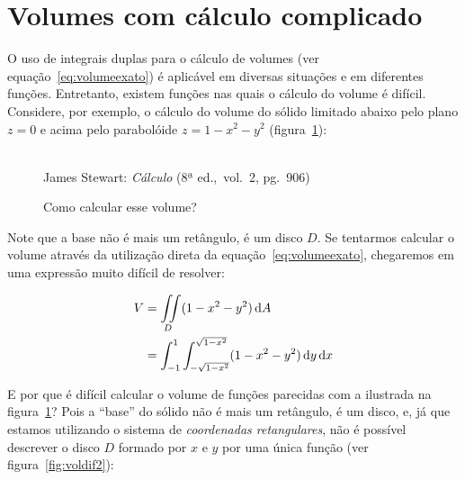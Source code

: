 \section{Volumes com cálculo complicado}
\label{sec:volumes-dificeis}

O uso de integrais duplas para o cálculo de volumes (ver
equação~\ref{eq:volumeexato}) é aplicável em diversas situações e
em diferentes funções. Entretanto, existem funções nas quais o cálculo do
volume é difícil. Considere, por exemplo, o cálculo do volume do
sólido limitado abaixo pelo plano $z = 0$ e acima pelo parabolóide $z
= 1 - x^2 - y^2$ (figura~\ref{fig:voldif}):

\begin{figure}[H]
  \begin{center}
    \caption{Como calcular esse volume?}
    \label{fig:voldif}
    \\
    \footnotesize{James Stewart: \emph{Cálculo} (8ª ed.,\ vol.\ 2,
      pg.\ 906)}
  \end{center}
\end{figure}

Note que a base não é mais um retângulo, é um disco $D$. Se tentarmos
calcular o volume através da utilização direta da
equação~\ref{eq:volumeexato}, chegaremos em uma expressão muito
difícil de resolver:

\begin{equation*}
    \begin{split}
      V &= \iint\displaylimits_D (1-x^2-y^2) \mathop{}\!\mathrm{d} A\\
        &= \int_{-1}^1 \int_{-\sqrt{1-x^2}}^{\sqrt{1-x^2}}(1-x^2-y^2)
      \mathop{}\!\mathrm{d} y \mathop{}\!\mathrm{d} x
    \end{split}
\end{equation*}

E por que é difícil calcular o volume de funções parecidas com a
ilustrada na figura~\ref{fig:voldif}? Pois a ``base'' do sólido não é
mais um retângulo, é um disco, e, já que estamos utilizando o sistema
de \emph{coordenadas retangulares}, não é possível descrever o disco $D$ formado
por $x$ e $y$ por uma única função (ver figura~\ref{fig:voldif2}):

